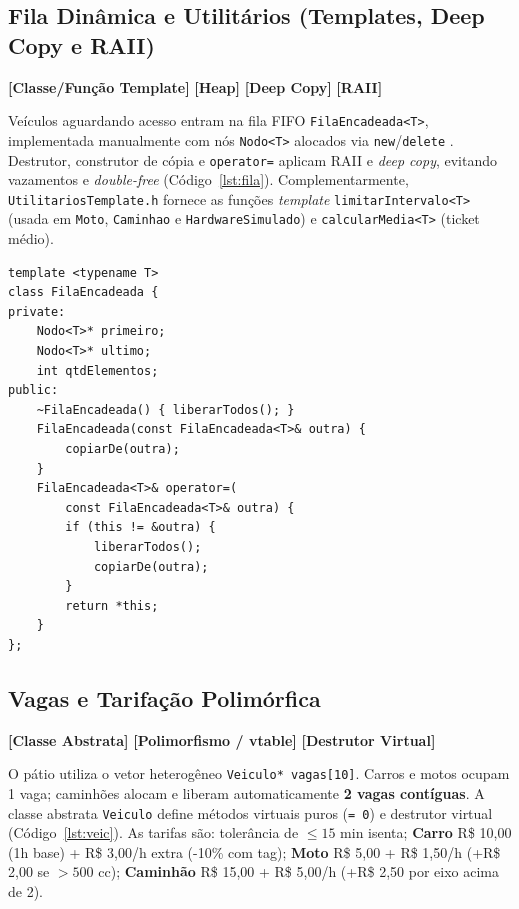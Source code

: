 \documentclass[10pt,twocolumn,a4paper]{article}
\newcommand{\code}[1]{\texttt{\footnotesize #1}}
\newcommand{\conceptbadge}[1]{\textbf{\color{ufscBlue}[#1]}}
\begin{document}
\subsection{Fila Dinâmica e Utilitários (Templates, Deep Copy e RAII)}

\conceptbadge{Classe/Função Template} \conceptbadge{Heap} \conceptbadge{Deep Copy} \conceptbadge{RAII}

Veículos aguardando acesso entram na fila FIFO \code{FilaEncadeada<T>}, implementada manualmente com nós \code{Nodo<T>} alocados via \code{new}/\code{delete} \cite{savitch2004,deitel2006}. Destrutor, construtor de cópia e \code{operator=} aplicam RAII e \textit{deep copy}, evitando vazamentos e \textit{double-free} (Código~\ref{lst:fila}). Complementarmente, \code{UtilitariosTemplate.h} fornece as funções \textit{template} \code{limitarIntervalo<T>} (usada em \code{Moto}, \code{Caminhao} e \code{HardwareSimulado}) e \code{calcularMedia<T>} (ticket médio).

\begin{lstlisting}[float=ht, label={lst:fila}, caption={Classe template \code{FilaEncadeada<T>} com RAII e Deep Copy.}]
template <typename T>
class FilaEncadeada {
private:
    Nodo<T>* primeiro;
    Nodo<T>* ultimo;
    int qtdElementos;
public:
    ~FilaEncadeada() { liberarTodos(); }
    FilaEncadeada(const FilaEncadeada<T>& outra) {
        copiarDe(outra);
    }
    FilaEncadeada<T>& operator=(
        const FilaEncadeada<T>& outra) {
        if (this != &outra) {
            liberarTodos();
            copiarDe(outra);
        }
        return *this;
    }
};
\end{lstlisting}

\subsection{Vagas e Tarifação Polimórfica}

\conceptbadge{Classe Abstrata} \conceptbadge{Polimorfismo / vtable} \conceptbadge{Destrutor Virtual}

O pátio utiliza o vetor heterogêneo \code{Veiculo* vagas[10]}. Carros e motos ocupam 1 vaga; caminhões alocam e liberam automaticamente \textbf{2 vagas contíguas}. A classe abstrata \code{Veiculo} define métodos virtuais puros (\code{= 0}) e destrutor virtual \cite{mizrahi2007,sutter2006} (Código~\ref{lst:veic}). As tarifas são: tolerância de $\le 15$ min isenta; \textbf{Carro} R\$ 10,00 (1h base) + R\$ 3,00/h extra (-10\% com tag); \textbf{Moto} R\$ 5,00 + R\$ 1,50/h (+R\$ 2,00 se $>500$ cc); \textbf{Caminhão} R\$ 15,00 + R\$ 5,00/h (+R\$ 2,50 por eixo acima de 2).
\end{document}
